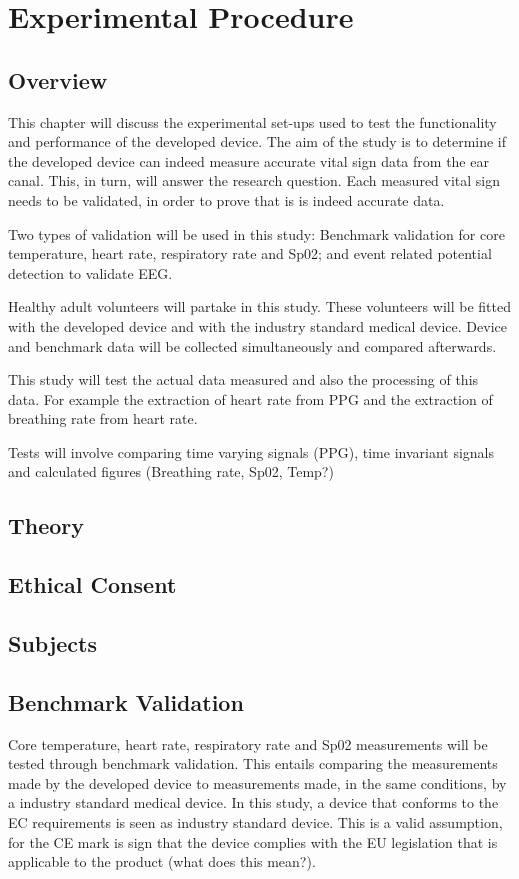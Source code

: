\chapter{Experimental Procedure}
\label{chp:DEM}
\section{Overview}
This chapter will discuss the experimental set-ups used to test the functionality and performance of the developed device. The aim of the study is to determine if the developed device can indeed measure accurate vital sign data from the ear canal. This, in turn, will answer the research question. Each measured vital sign needs to be validated, in order to prove that is is indeed accurate data.

Two types of validation will be used in this study: Benchmark validation for core temperature, heart rate, respiratory rate and Sp02; and event related potential detection to validate EEG.

Healthy adult volunteers will partake in this study. These volunteers will be fitted with the developed device and with the industry standard medical device. Device and benchmark data will be collected simultaneously and compared afterwards.

This study will test the actual data measured and also the processing of this data. For example the extraction of heart rate from PPG and the extraction of breathing rate from heart rate.

Tests will involve comparing time varying signals (PPG), time invariant signals and calculated figures (Breathing rate, Sp02, Temp?)

\section{Theory}
\section{Ethical Consent}
\section{Subjects}

\section{Benchmark Validation}
Core temperature, heart rate, respiratory rate and Sp02 measurements will be tested through benchmark validation. This entails comparing the measurements made by the developed device to measurements made, in the same conditions, by a industry standard medical device. In this study, a device that conforms to the EC requirements is seen as industry standard device. This is a valid assumption, for the CE mark is sign that the device complies with the EU legislation that is applicable to the product (what does this mean?).

